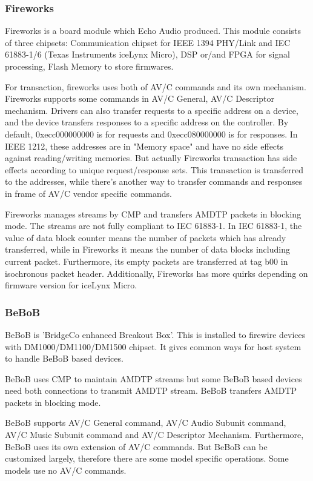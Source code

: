 \documentclass[onecolumn]{article}
\begin{document}
\subsubsection{Fireworks}
Fireworks is a board module which Echo Audio produced. This module consists of three chipsets: Communication chipset for IEEE 1394 PHY/Link and IEC 61883-1/6 (Texas Instruments iceLynx Micro), DSP or/and FPGA for signal processing, Flash Memory to store firmwares.

For transaction, fireworks uses both of AV/C commands and its own mechanism. Fireworks supports some commands in AV/C General\cite{avc-general-4-2}, AV/C Descriptor mechanism\cite{avc-general-enhancement}. Drivers can also transfer requests to a specific address on a device, and the device transfers responses to a specific address on the controller. By default, 0xecc000000000 is for requests and 0xecc080000000 is for responses. In IEEE 1212, these addresses are in "Memory space" and have no side effects against reading/writing memories. But actually Fireworks transaction has side effects according to unique request/response sets. This transaction is transferred to the addresses, while there's another way to transfer commands and responses in frame of AV/C vendor specific commands.

Fireworks manages streams by CMP and transfers AMDTP packets in blocking mode. The streams are not fully compliant to IEC 61883-1. In IEC 61883-1, the value of data block counter means the number of packets which has already transferred, while in Fireworks it means the number of data blocks including current packet. Furthermore, its empty packets are transferred at tag b00 in isochronous packet header. Additionally, Fireworks has more quirks depending on firmware version for iceLynx Micro.


\subsubsection{BeBoB}
BeBoB is 'BridgeCo enhanced Breakout Box'. This is installed to firewire devices with DM1000/DM1100/DM1500 chipset. It gives common ways for host system to handle BeBoB based devices.

BeBoB uses CMP to maintain AMDTP streams but some BeBoB based devices need both connections to transmit AMDTP stream. BeBoB transfers AMDTP packets in blocking mode.

BeBoB supports AV/C General command\cite{avc-general-4-2}, AV/C Audio Subunit command\cite{avc-audio-1}, AV/C Music Subunit command\cite{avc-music-1} and AV/C Descriptor Mechanism\cite{avc-general-enhancement}. Furthermore, BeBoB uses its own extension of AV/C commands\cite{bebob-1, bebob-2}. But BeBoB can be customized largely, therefore there are some model specific operations. Some models use no AV/C commands.
\end{document}
